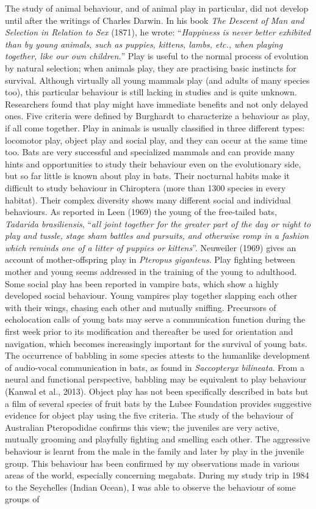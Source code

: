 {The study of animal behaviour, and of animal play in particular, did not develop until after the writings of Charles Darwin. In his book \textit{The Descent of Man and Selection in Relation to Sex} (1871), he wrote: ``\textsl{Happiness is never better exhibited than by young animals, such as puppies, kittens, lambs, etc., when playing together, like our own children.}'' Play is useful to the normal process of evolution by natural selection; when animals play, they are practising basic instincts for survival. Although virtually all young mammals play (and adults of many species too), this particular behaviour is still lacking in studies and is quite unknown. Researchers found that play might have immediate benefits and not only delayed ones. Five criteria were defined by Burghardt to characterize a behaviour as play, if all come together. Play in animals is usually classified in three different types: locomotor play, object play and social play, and they can occur at the same time too. Bats are very successful and specialized mammals and can provide many hints and opportunities to study their behaviour even on the evolutionary side, but so far little is known about play in bats. Their nocturnal habits make it difficult to study behaviour in Chiroptera (more than 1300 species in every habitat). Their complex diversity shows many different social and individual behaviours. As reported in Leen (1969) the young of the free-tailed bats, \emph{Tadarida brasiliensis}, ``\textsl{all joint together for the greater part of the day or night to play and tussle, stage sham battles and pursuits, and otherwise romp in a fashion which reminds one of a litter of puppies or kittens}''. Neuweiler (1969) gives an account of mother-offspring play in \emph{Pteropus giganteus}. Play fighting between mother and young seems addressed in the training of the young to adulthood. Some social play has been reported in vampire bats, which show a highly developed social behaviour. Young vampires play together slapping each other with their wings, chasing each other and mutually sniffing. Precursors of echolocation calls of young bats may serve a communication function during the first week prior to its modification and thereafter be used for orientation and navigation, which becomes increasingly important for the survival of young bats. The occurrence of babbling in some species attests to the humanlike development of audio-vocal communication in bats, as found in \emph{Saccopteryx bilineata}. From a neural and functional perspective, babbling may be equivalent to play behaviour (Kanwal et al., 2013). Object play has not been specifically described in bats but a film of several species of fruit bats by the Lubee Foundation provides suggestive evidence for object play using the five criteria. The study of the behaviour of Australian Pteropodidae confirms this view; the juveniles are very active, mutually grooming and playfully fighting and smelling each other. The aggressive behaviour is learnt from the male in the family and later by play in the juvenile group. This behaviour has been confirmed by my observations made in various areas of the world, especially concerning megabats. During my study trip in 1984 to the Seychelles (Indian Ocean), I was able to observe the behaviour of some groups of }
